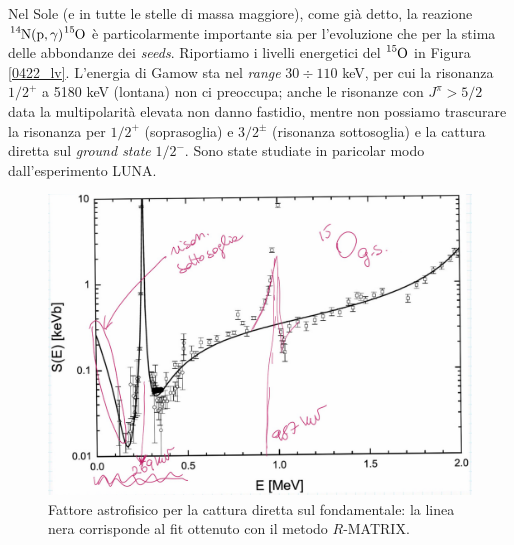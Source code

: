 \noindent Nel Sole (e in tutte le stelle di massa maggiore), come già detto, la reazione $\ce{^{14}N(p,\gamma)\ce{^{15}O}}$ è particolarmente importante sia per l'evoluzione che per la stima delle abbondanze dei \textit{seeds}. Riportiamo i livelli energetici del $\ce{^{15}O}$ in Figura \ref{0422_lv}. L'energia di Gamow sta nel \textit{range} $30\div 110$ keV, per cui la risonanza $1/2^+$ a 5180 keV (lontana) non ci preoccupa; anche le risonanze con $J^\pi> 5/2$ data la multipolarità elevata non danno fastidio, mentre non possiamo trascurare la risonanza per $1/2^+$ (soprasoglia) e $3/2^\pm$ (risonanza sottosoglia) e la cattura diretta sul \textit{ground state} $1/2^-$. Sono state studiate in paricolar modo dall'esperimento LUNA.

\begin{figure}[h]
	\centering
	\includegraphics[scale=0.5]{Immagini/0422_0-Se.png}
	\caption{Fattore astrofisico per la cattura diretta sul fondamentale: la linea nera corrisponde al fit ottenuto con il metodo $R$-MATRIX.}
	\label{0422_cattura}
\end{figure}

